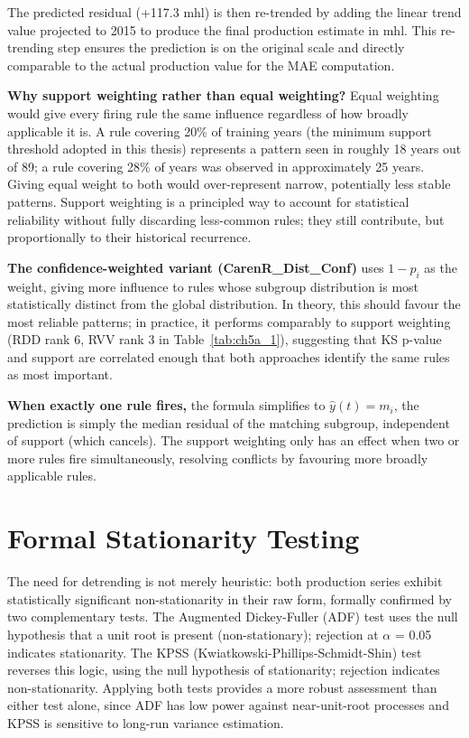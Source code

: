 The predicted residual (+117.3 mhl) is then re-trended by adding the linear trend value projected to 2015 to produce the final production estimate in mhl. This re-trending step ensures the prediction is on the original scale and directly comparable to the actual production value for the MAE computation.

\textbf{Why support weighting rather than equal weighting? }Equal weighting would give every firing rule the same influence regardless of how broadly applicable it is. A rule covering 20\% of training years (the minimum support threshold adopted in this thesis) represents a pattern seen in roughly 18 years out of 89; a rule covering 28\% of years was observed in approximately 25 years. Giving equal weight to both would over-represent narrow, potentially less stable patterns. Support weighting is a principled way to account for statistical reliability without fully discarding less-common rules; they still contribute, but proportionally to their historical recurrence.

\textbf{The confidence-weighted variant (CarenR\_Dist\_Conf) }uses $1-p_i$ as the weight, giving more influence to rules whose subgroup distribution is most statistically distinct from the global distribution. In theory, this should favour the most reliable patterns; in practice, it performs comparably to support weighting (RDD rank 6, RVV rank 3 in Table~\ref{tab:ch5a_1}), suggesting that KS p-value and support are correlated enough that both approaches identify the same rules as most important.

\textbf{When exactly one rule fires, }the formula simplifies to $\hat{y}(t) = m_i$, the prediction is simply the median residual of the matching subgroup, independent of support (which cancels). The support weighting only has an effect when two or more rules fire simultaneously, resolving conflicts by favouring more broadly applicable rules.




\section{Formal Stationarity Testing}\label{sec:formal_stationarity_testing}

The need for detrending is not merely heuristic: both production series exhibit statistically significant non-stationarity in their raw form, formally confirmed by two complementary tests. The Augmented Dickey-Fuller (ADF) test uses the null hypothesis that a unit root is present (non-stationary); rejection at $\alpha$ = 0.05 indicates stationarity. The KPSS (Kwiatkowski-Phillips-Schmidt-Shin) test reverses this logic, using the null hypothesis of stationarity; rejection indicates non-stationarity. Applying both tests provides a more robust assessment than either test alone, since ADF has low power against near-unit-root processes and KPSS is sensitive to long-run variance estimation.

